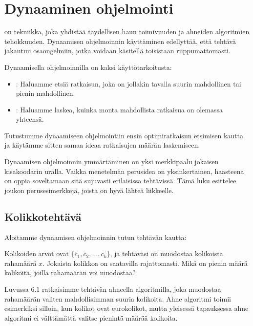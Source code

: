 \chapter{Dynaaminen ohjelmointi}


on tekniikka, joka yhdistää täydellisen haun
toimivuuden ja ahneiden algoritmien tehokkuuden.
Dynaamisen ohjelmoinnin käyttäminen edellyttää,
että tehtävä jakautuu osaongelmiin,
jotka voidaan käsitellä toisistaan riippumattomasti.

Dynaamisella ohjelmoinnilla on kaksi käyttötarkoitusta:

\begin{itemize}
\item
{}:
Haluamme etsiä ratkaisun, joka on
jollakin tavalla suurin mahdollinen
tai pienin mahdollinen.
\item
{}:
Haluamme laskea, kuinka monta mahdollista
ratkaisua on olemassa yhteensä.
\end{itemize}

Tutustumme dynaamiseen ohjelmointiin ensin
optimiratkaisun etsimisen kautta ja käytämme sitten
samaa ideaa ratkaisujen määrän laskemiseen.

Dynaamisen ohjelmoinnin ymmärtäminen on yksi merkkipaalu
jokaisen kisakoodarin uralla.
Vaikka menetelmän perusidea on yksinkertainen,
haasteena on oppia soveltamaan sitä sujuvasti
erilaisissa tehtävissä.
Tämä luku esittelee joukon
perusesimerkkejä, joista on hyvä lähteä liikkeelle.

\section{Kolikkotehtävä}

Aloitamme dynaamisen ohjelmoinnin tutun tehtävän kautta:

\begin{task}
Kolikoiden arvot ovat $\{c_1,c_2,\ldots,c_k\}$,
ja tehtäväsi on muodostaa kolikoista rahamäärä $x$.
Jokaista kolikkoa on saatavilla rajattomasti.
Mikä on pienin määrä kolikoita,
joilla rahamäärän voi muodostaa?
\end{task}

Luvussa 6.1 ratkaisimme tehtävän ahneella algoritmilla,
joka muodostaa rahamäärän valiten mahdollisimman
suuria kolikoita.
Ahne algoritmi toimii esimerkiksi silloin,
kun kolikot ovat eurokolikot,
mutta yleisessä tapauksessa ahne algoritmi
ei välttämättä valitse pienintä määrää kolikoita.

